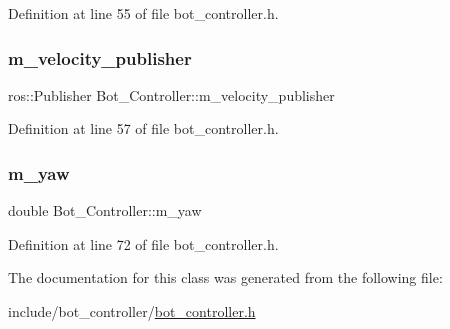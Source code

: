 Definition at line 55 of file bot\+\_\+controller.\+h.

\mbox{\label{class_bot___controller_a4ffa549048f2deb56585dccb829bc799}} 
\subsubsection{\texorpdfstring{m\+\_\+velocity\+\_\+publisher}{m\_velocity\_publisher}}
{\footnotesize\ttfamily ros\+::\+Publisher Bot\+\_\+\+Controller\+::m\+\_\+velocity\+\_\+publisher\hspace{0.3cm}{\ttfamily [protected]}}



Definition at line 57 of file bot\+\_\+controller.\+h.

\mbox{\label{class_bot___controller_a86f4b79640605ce24d6ced079bb61d46}} 
\subsubsection{\texorpdfstring{m\+\_\+yaw}{m\_yaw}}
{\footnotesize\ttfamily double Bot\+\_\+\+Controller\+::m\+\_\+yaw\hspace{0.3cm}{\ttfamily [protected]}}



Definition at line 72 of file bot\+\_\+controller.\+h.



The documentation for this class was generated from the following file\+:\begin{DoxyCompactItemize}
\item 
include/bot\+\_\+controller/\hyperlink{bot__controller_8h}{bot\+\_\+controller.\+h}\end{DoxyCompactItemize}
